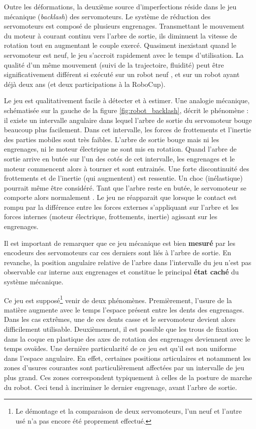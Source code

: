 Outre les déformations, la deuxième source d'imperfections
réside dans le jeu mécanique (\textit{backlash}) des servomoteurs.
Le système de réduction des servomoteurs est composé de plusieurs
engrenages. Transmettant le mouvement du moteur à courant continu
vers l'arbre de sortie, ils diminuent la vitesse de rotation
tout en augmentant le couple exercé.
Quasiment inexistant quand le servomoteur est neuf, le jeu s'accroit
rapidement avec le temps d'utilisation.
La qualité d'un même mouvement (suivi de la trajectoire, fluidité)
peut être significativement différent si exécuté sur un robot \og neuf \fg,
et sur un robot ayant déjà deux ans (et deux participations à la RoboCup).

Le jeu est qualitativement facile à détecter et à estimer.
Une analogie mécanique, schématisée sur la gauche de la figure \ref{fig:robot_backlash},
décrit le phénomène : il existe un intervalle angulaire dans lequel 
l'arbre de sortie du servomoteur bouge beaucoup plus facilement.
Dans cet intervalle, les forces de frottements et l'inertie des parties mobiles
sont très faibles.
L'arbre de sortie bouge mais ni les engrenages, ni le moteur électrique ne sont
mis en rotation.
Quand l'arbre de sortie arrive en butée sur l'un des cotés de cet intervalle,
les engrenages et le moteur commencent alors à tourner et sont entrainés.
Une forte discontinuité des frottements et de l'inertie (qui augmentent) est ressentie.
Un choc (inélastique) pourrait même être considéré.
Tant que l'arbre reste en butée, le servomoteur se comporte alors \og normalement \fg.
Le jeu ne réapparait que lorsque le contact est rompu par la différence 
entre les forces externes s'appliquant sur l'arbre et les forces internes 
(moteur électrique, frottements, inertie) agissant sur les engrenages.

Il est important de remarquer que ce jeu mécanique est bien \textbf{mesuré} par
les encodeurs des servomoteurs car ces derniers sont liés à l'arbre de sortie.
En revanche, la position angulaire relative de l'arbre dans l'intervalle du jeu
n'est pas observable car interne aux engrenages et constitue le principal
\textbf{état caché} du système mécanique.

Ce jeu est supposé\footnote{Le démontage et la comparaison de deux servomoteurs, l'un neuf
et l'autre usé n'a pas encore été proprement effectué.} venir de deux phénomènes.
Premièrement, l'usure de la matière augmente avec le temps l'espace présent 
entre les dents des engrenages.
Dans les cas extrêmes, une de ces dents casse et le servomoteur devient
alors difficilement utilisable.
Deuxièmement, il est possible que les trous de fixation dans la coque en plastique
des axes de rotation des engrenages deviennent avec le temps ovoïdes.
Une dernière particularité de ce jeu est qu'il est non uniforme dans l'espace angulaire.
En effet, certaines positions articulaires et notamment les zones d'usures courantes sont
particulièrement affectées par un intervalle de jeu plus grand.
Ces zones correspondent typiquement à celles de la posture de marche du robot.
Ceci tend à incriminer le dernier engrenage, avant l'arbre de sortie.

